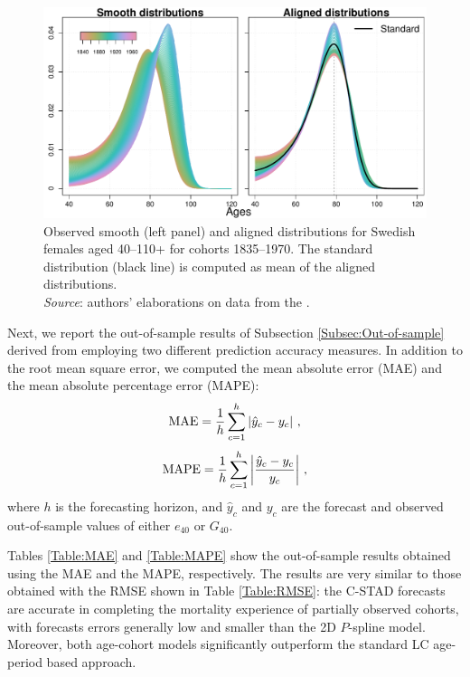 \documentclass[11pt, a4paper]{article}
\begin{document}
\begin{figure}[t]
	\begin{center}
		\includegraphics[scale=0.57]{./Figures/FA0.pdf}
		\caption{{\color{red}Observed smooth (left panel) and aligned distributions for Swedish females aged 40--110+ for cohorts 1835--1970. The standard distribution (black line) is computed as mean of the aligned distributions. \\ \small \textit{Source}: authors' elaborations on data from the \cite{HMD}.}}\label{Fig:Alignment}	
	\end{center}
\end{figure}

{\color{red}Next,} we report the out-of-sample results of Subsection \ref{Subsec:Out-of-sample} derived from employing two different prediction accuracy measures. In addition to the root mean square error, we computed the mean absolute error (MAE) and the mean absolute percentage error (MAPE):
%
\begin{equation}\label{Eq:MAE}
\mathrm{MAE} = \frac{1}{h} \sum_{c=1}^{h} \left| \hat{y}_c - y_c \right|  \, , \notag 
\end{equation} 
%
\begin{equation}\label{Eq:MAPE}
\mathrm{MAPE}= \frac{1}{h}  \sum_{c=1}^{h} \left| \frac{\hat{y}_c - y_c}{y_c}  \right| \, , \notag
\end{equation} 
%
where $h$ is the forecasting horizon, and $\hat{y}_c$ and $y_c$ are the forecast and observed out-of-sample values of either $e_{40}$ or $G_{40}$. 

Tables \ref{Table:MAE} and \ref{Table:MAPE} show the out-of-sample results obtained using the MAE and the MAPE, respectively. The results are very similar to those obtained with the RMSE shown in Table \ref{Table:RMSE}: the C-STAD forecasts are accurate in completing the mortality experience of partially observed cohorts, with forecasts errors generally low and smaller than the 2D $P$-spline model. {\color{red}Moreover, both age-cohort models significantly outperform the standard LC age-period based approach.}
  
\end{document}
